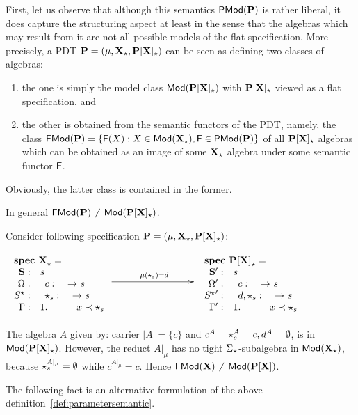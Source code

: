 First, let us observe that although this semantics ${\sf {PMod}}({\bf P})$ is
rather liberal, it does capture the structuring aspect at least in the sense
that the algebras which may result from it are not all possible models of the
flat specification. More precisely, a PDT ${\bf P} = (\mu,{\bf X_\star},{\bf P[X]_\star})$ can be seen as
defining two classes of algebras: 
\begin{enumerate}\MyLPar
\item the one is simply the model class
${\sf {Mod}}({\bf P[X]_\star})$ with ${\bf P[X]_\star}$ viewed as a flat specification, and 
\item the
other is obtained from the semantic functors of the PDT, namely, the class
${\sf {FMod}}({\bf P})=\{ {\sf {F}}(X): X\in{\sf {Mod}}({\bf X_\star}), {\sf {F}}\in{\sf {PMod}}({\bf P})\}$ 
of all ${\bf P[X]_\star}$ algebras which can be obtained as an image of some ${\bf X}_\star$
algebra under some semantic functor ${\sf {F}}$.
\end{enumerate}
Obviously, the latter class is contained in the former. 
\begin{fact} 
In general ${\sf {FMod}}({\bf P}) \not= {\sf {Mod}}({\bf P[X]_\star})$.
\end{fact}
\begin{PROOF}
Consider following specification ${\bf P} = (\mu,{\bf X_\star},{\bf P[X]_\star})$:

\( 
\xymatrix{
	{\txt{\spec{
	\tit{\mbox{\bf spec\ X}_\cons^{{}}=} \\
		\spSorts{\Sorts}{s}
		\spOps{\Ops}{c:		&& s}
		\spOps{\allcons}{\cons_{s}:	&& s}
		\Gamma:
			&1.& && x \prec \cons_{s} \\
	} }}
\ar[rrr]^{\mu(\cons_s)=d}
&&& 
	{\txt{ \spec{
	\tit{\mbox{\bf spec\ P[X]}_\cons^{{}}=} \\
		\spSorts{\Sorts'}{s}
		\spOps{\Ops'}{c:&& s}
		\spOps{{\allcons}'}{d,\cons_{s}:	&& s}
		\Gamma':
			&1.& && x \prec \cons_{s} \\
	}  }}
}
\)

\noindent
The algebra $A$ given by: carrier $|A|=\{c\}$ and $c^A = \star_s^A = c, d^A =
\emptyset$, is in ${\sf {Mod}}({\bf P[X]_\star})$.
However, the reduct $A|_\mu$ has no tight $\Sigma_\star$-subalgebra in
${\sf {Mod}}({\bf X}_\star)$, because $\star_s^{A|_\mu}=\emptyset$ while
$c^{A|_\mu}=c$. Hence ${\sf {FMod}}({\bf X}) \not= {\sf {Mod}}({\bf P[X]})$.
\end{PROOF}
%
%
The following fact is an alternative formulation of the above definition~\ref{def:parametersemantic}.

